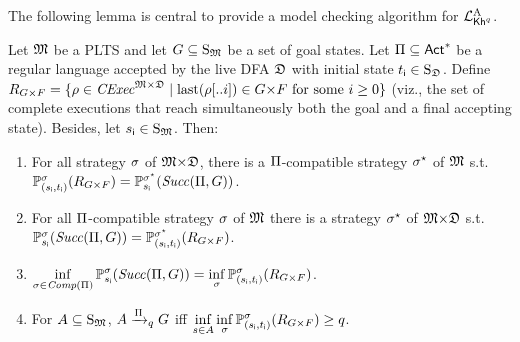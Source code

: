 The following lemma is central to provide a model checking
algorithm for ${\mathcal{L}^{\mathrm{A}}_{{\mathsf{Kh}}^q}}$.

\begin{lemma}\label{lm:mc:core}
  Let ${\mathfrak{M}}$ be a PLTS and let $G\subseteq\operatorname{S}_{\mathfrak{M}}$ be a set of
  goal states.
  Let $\Pi\subseteq{\rm \sf Act}^*$ be a regular language accepted by the
  live DFA ${\mathfrak{D}}$ with initial state ${t_{\textsf{i}}}\in\operatorname{S}_{\mathfrak{D}}$.  Define
  $R_{G{\times}F} = \{{\rho\in\mathit{CExec}^{{\mathfrak{M}}{\times}{\mathfrak{D}}}} \mid \mathrm{last}(\rho[..i])\in{G{\times}F} \text{ for some }{i\geq 0}\}$
  (viz., the set of complete executions that reach simultaneously both
  the goal and a final accepting state).
  Besides, let ${s_{\textsf{i}}}\in\operatorname{S}_{\mathfrak{M}}$. Then:
  \begin{enumerate}
  \item\label{lm:mc:core:i}%
    For all strategy $\sigma$ of ${\mathfrak{M}}{\times}{\mathfrak{D}}$, there is
    a $\Pi$-compatible strategy $\sigma^\star$ of ${\mathfrak{M}}$ s.t.\
    $\mathbb{P}^{\sigma}_{({s_{\textsf{i}}},{t_{\textsf{i}}})}(R_{G{\times}F}) = \mathbb{P}^{\sigma^\star}_{{s_{\textsf{i}}}}(\mathit{Succ}(\Pi,G))$.
  \item\label{lm:mc:core:ii}%
    For all $\Pi$-compatible strategy $\sigma$ of ${\mathfrak{M}}$
    there is a strategy $\sigma^\star$ of ${\mathfrak{M}}{\times}{\mathfrak{D}}$ s.t.\
    $\mathbb{P}^{\sigma}_{{s_{\textsf{i}}}}(\mathit{Succ}(\Pi,G)) = \mathbb{P}^{\sigma^\star}_{({s_{\textsf{i}}},{t_{\textsf{i}}})}(R_{G{\times}F})$.
  \item\label{lm:mc:core:iii}%
    $\displaystyle\inf_{\sigma\in\mathit{Comp}(\Pi)}\mathbb{P}^{\sigma}_{{s_{\textsf{i}}}}(\mathit{Succ}(\Pi,G)) = \inf_{\sigma}\mathbb{P}^{\sigma}_{({s_{\textsf{i}}},{t_{\textsf{i}}})}(R_{G{\times}F})$.
  \item\label{lm:mc:core:iv}%
    For $A\subseteq\operatorname{S}_{\mathfrak{M}}$, $A\xrightarrow{\Pi}_qG$ iff
    $\displaystyle\inf_{s\in A}\inf_{\sigma}\mathbb{P}^{\sigma}_{({s_{\textsf{i}}},{t_{\textsf{i}}})}(R_{G{\times}F})\geq q$.
  \end{enumerate}
\end{lemma}
%
\newcommand{\setR}{\mathcal{R}}
\newcommand{\setS}{\mathcal{S}}
\newcommand{\setRini}{\setR_{\mathsf{i}}}
\newcommand{\setSini}{\setS_{\mathsf{i}}}
